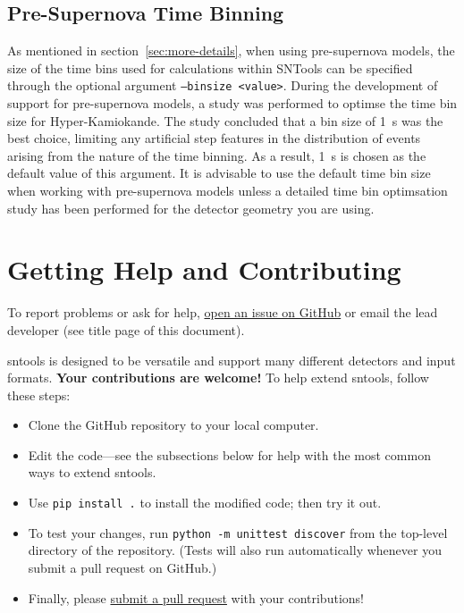 \documentclass[11pt, oneside]{article}
\begin{document}
\subsection{Pre-Supernova Time Binning}\label{sec:pre-supernova-time-binning}
As mentioned in section~\ref{sec:more-details}, when using pre-supernova models, the size of the time bins used for calculations within SNTools can be specified through the optional argument \texttt{--binsize <value>}.
During the development of support for pre-supernova models, a study was performed to optimse the time bin size for Hyper-Kamiokande. The study concluded that a bin size of \SI{1}{s} was the best choice,  
limiting any artificial step features in the distribution of events arising from the nature of the time binning. As a result, \SI{1}{s} is chosen as the default value of this argument.
It is advisable to use the default time bin size when working with pre-supernova models unless a detailed time bin optimsation study has been performed for the detector geometry you are using.  

\section{Getting Help and Contributing}

To report problems or ask for help, \href{https://github.com/SNEWS2/sntools/issues}{open an issue on GitHub} or email the lead developer (see title page of this document).

sntools is designed to be versatile and support many different detectors and input formats.
\textbf{Your contributions are welcome!}
To help extend sntools, follow these steps:

\begin{itemize}
	\item Clone the GitHub repository to your local computer.
	\item Edit the code---see the subsections below for help with the most common ways to extend sntools.
	\item Use \texttt{pip install .} to install the modified code; then try it out.
	\item To test your changes, run \texttt{python -m unittest discover} from the top-level directory of the repository. (Tests will also run automatically whenever you submit a pull request on GitHub.)
	\item Finally, please \href{https://docs.github.com/en/github/collaborating-with-issues-and-pull-requests/about-pull-requests}{submit a pull request} with your contributions!
\end{itemize}
\end{document}
